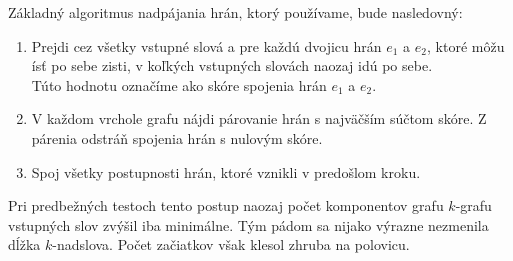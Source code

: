 Základný algoritmus nadpájania hrán, ktorý používame, bude nasledovný:
\begin{enumerate}
    \item Prejdi cez všetky vstupné slová a pre každú dvojicu hrán $e_1$ a $e_2$, ktoré
          môžu ísť po sebe zisti, v koľkých vstupných slovách naozaj idú po sebe.\\
          Túto hodnotu označíme ako skóre spojenia hrán $e_1$ a $e_2$.
    \item V každom vrchole grafu nájdi párovanie hrán s najväčším súčtom skóre. Z
          párenia odstráň spojenia hrán s nulovým skóre.
    \item Spoj všetky postupnosti hrán, ktoré vznikli v predošlom kroku.
\end{enumerate}

Pri predbežných testoch tento postup naozaj počet
komponentov grafu $k$-grafu vstupných slov zvýšil iba minimálne. Tým pádom
sa nijako výrazne nezmenila dĺžka $k$-nadslova.
Počet začiatkov však klesol zhruba na polovicu.
